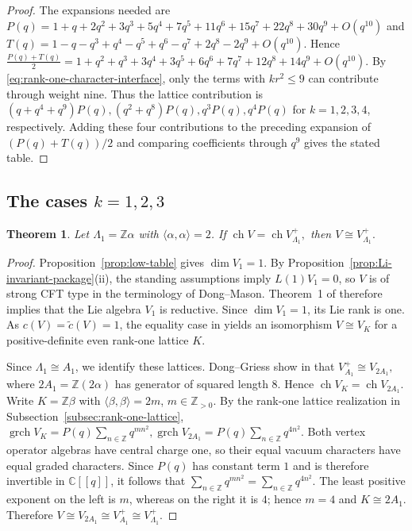 \documentclass[10pt,a4paper]{amsart}
\numberwithin{equation}{section} \newtheorem{thm}{Theorem}[section] \newtheorem{lem}[thm]{Lemma} \newtheorem{ex}[thm]{Example} \newtheorem{prop}[thm]{Proposition} \newtheorem{cor}[thm]{Corollary} \newtheorem{defi}[thm]{Definition} \newtheorem{rmk}[thm]{Remark} \newtheorem{notation}[thm]{Notation}
\newcommand{\ch}{\operatorname{ch}}
\newcommand{\grch}{\operatorname{grch}}
\def\Z{\mathbb{Z}} \def\N{\mathbb{N}} \def\A{\mathbb{A}} \def\C{\mathbb{C}} \def\R{\mathbb{R}} \def\Q{\mathbb{Q}} \def\F{\mathbb{F}}
\begin{document}
\begin{proof}
The expansions needed are \(P(q)=1+q+2q^2+3q^3+5q^4+7q^5+11q^6+15q^7+22q^8+30q^9+O(q^{10})\) and \(T(q)=1-q-q^3+q^4-q^5+q^6-q^7+2q^8-2q^9+O(q^{10}).\) Hence \(\frac{P(q)+T(q)}2 =1+q^2+q^3+3q^4+3q^5+6q^6+7q^7+12q^8+14q^9+O(q^{10}).\) By \eqref{eq:rank-one-character-interface}, only the terms with $kr^2\le9$ can contribute through weight nine. Thus the lattice contribution is \((q+q^4+q^9)P(q), (q^2+q^8)P(q), q^3P(q), q^4P(q)\) for $k=1,2,3,4$, respectively. Adding these four contributions to the preceding expansion of $(P(q)+T(q))/2$ and comparing coefficients through $q^9$ gives the stated table.
\end{proof}

\subsection{The cases \texorpdfstring{$k=1,2,3$}{k=1,2,3}}

\begin{thm}\label{thm:k1}
Let $\Lambda_1=\Z\alpha$ with $\langle\alpha,\alpha\rangle=2$. If \(\ch V=\ch V_{\Lambda_1}^+,\) then \(V\cong V_{\Lambda_1}^+.\)
\end{thm}

\begin{proof}
Proposition~\ref{prop:low-table} gives $\dim V_1=1$. By Proposition~\ref{prop:Li-invariant-package}(ii), the standing assumptions imply $L(1)V_1=0$, so $V$ is of strong CFT type in the terminology of Dong--Mason. Theorem~1 of \cite{DM} therefore implies that the Lie algebra $V_1$ is reductive. Since $\dim V_1=1$, its Lie rank is one. As $c(V)=\widetilde c(V)=1$, the equality case in \cite[Theorem~3]{DM} yields an isomorphism \(V\cong V_K\) for a positive-definite even rank-one lattice $K$.

Since $\Lambda_1\cong A_1$, we identify these lattices. Dong--Griess show in \cite[Section~3]{DG98} that \(V_{A_1}^+\cong V_{2A_1},\) where $2A_1=\Z(2\alpha)$ has generator of squared length $8$. Hence \(\ch V_K=\ch V_{2A_1}.\) Write $K=\Z\beta$ with $\langle\beta,\beta\rangle=2m$, $m\in\Z_{>0}$. By the rank-one lattice realization in Subsection~\ref{subsec:rank-one-lattice}, \(\grch V_K=P(q)\sum_{n\in\Z}q^{mn^2}, \grch V_{2A_1}=P(q)\sum_{n\in\Z}q^{4n^2}.\) Both vertex operator algebras have central charge one, so their equal vacuum characters have equal graded characters. Since $P(q)$ has constant term $1$ and is therefore invertible in $\C[[q]]$, it follows that \(\sum_{n\in\Z}q^{mn^2}=\sum_{n\in\Z}q^{4n^2}.\) The least positive exponent on the left is $m$, whereas on the right it is $4$; hence $m=4$ and $K\cong2A_1$. Therefore \(V\cong V_{2A_1}\cong V_{A_1}^+\cong V_{\Lambda_1}^+.\)
\end{proof}
\end{document}

